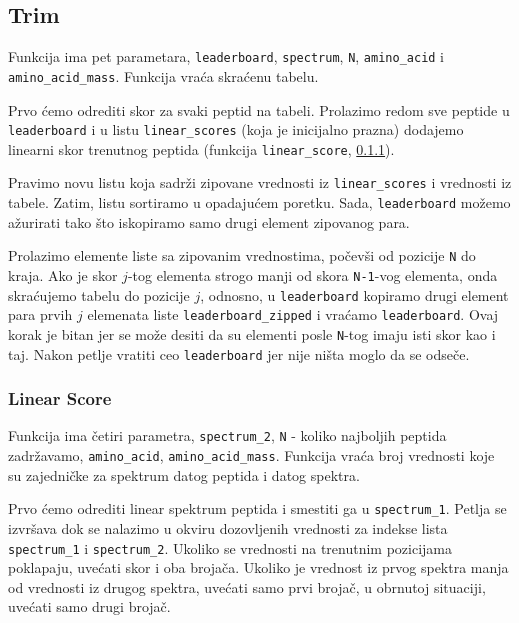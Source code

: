 



\subsection{Trim}
\label{trim} 

Funkcija ima pet parametara, \texttt{leaderboard}, \texttt{spectrum}, \texttt{N}, \texttt{amino\_acid} i \texttt{amino\_acid\_mass}.  Funkcija vraća skraćenu tabelu.

Prvo ćemo odrediti skor za svaki peptid na tabeli. Prolazimo redom sve peptide u \texttt{leaderboard} i u listu \texttt{linear\_scores} (koja je inicijalno prazna) dodajemo linearni skor trenutnog peptida (funkcija \texttt{linear\_score}, \ref{scoreLinear}).

Pravimo novu listu koja sadrži zipovane vrednosti iz \texttt{linear\_scores} i vrednosti iz tabele. Zatim, listu sortiramo u opadajućem poretku. Sada, \texttt{leaderboard} možemo ažurirati tako što iskopiramo samo drugi element zipovanog para. 

Prolazimo elemente liste sa zipovanim vrednostima, počevši od pozicije \texttt{N} do kraja. Ako je skor $j$-tog elementa strogo manji od skora \texttt{N-1}-vog elementa, onda skraćujemo tabelu do pozicije $j$, odnosno, u \texttt{leaderboard} kopiramo drugi element para prvih $j$ elemenata liste \texttt{leaderboard\_zipped} i vraćamo \texttt{leaderboard}. Ovaj korak je bitan jer se može desiti da su elementi posle \texttt{N}-tog imaju isti skor kao i taj. Nakon petlje vratiti ceo \texttt{leaderboard} jer nije ništa moglo da se odseče.





\subsubsection{Linear Score}
\label{scoreLinear} 

Funkcija ima četiri parametra, \texttt{spectrum\_2}, \texttt{N} - koliko najboljih peptida zadržavamo, \texttt{amino\_acid},  \texttt{amino\_acid\_mass}. Funkcija vraća broj vrednosti koje su zajedničke za spektrum datog peptida i datog spektra.

Prvo ćemo odrediti linear spektrum peptida i smestiti ga u \texttt{spectrum\_1}. Petlja se izvršava dok se nalazimo u okviru dozovljenih vrednosti za indekse lista \texttt{spectrum\_1} i \texttt{spectrum\_2}. Ukoliko se vrednosti na trenutnim pozicijama poklapaju, uvećati skor i oba brojača. Ukoliko je vrednost iz prvog spektra manja od vrednosti iz drugog spektra, uvećati samo prvi brojač, u obrnutoj situaciji, uvećati samo drugi brojač.


